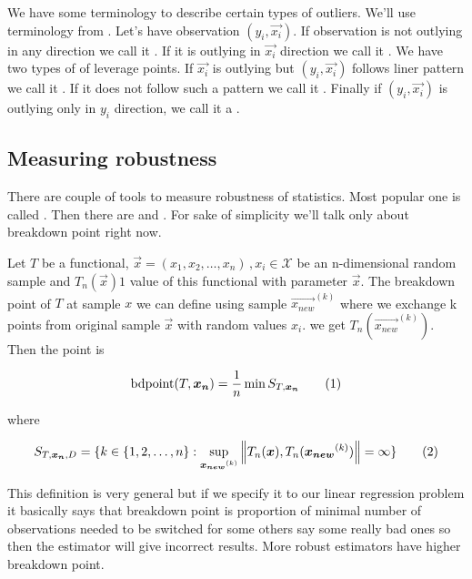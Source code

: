 We have some terminology to describe certain types of outliers. We'll use terminology from \cite{rouss:1990}. Let's have observation $(y_i, \vec{x_i})$. If observation is not outlying in any direction we call it  . If it is outlying in $\vec{x_i}$ direction we call it . We have two types of of leverage points. If $\vec{x_i}$ is outlying but $(y_i, \vec{x_i})$ follows liner pattern we call it  . If it does not follow such a pattern we call it . Finally if $(y_i, \vec{x_i})$ is  outlying only in $y_i$  direction, we call it a .

\subsection{Measuring robustness}
There are couple of tools to measure robustness of statistics. Most popular one is called . Then there are  and . For sake of simplicity we'll talk only about breakdown point right now. 

\begin{definition}
    Let $T$ be a functional, $\vec{x} = (x_1, x_2,\ldots,x_n)\,, x_i \in \mathcal{X}$ be an n-dimensional random sample and $T_n(\vec{x})1$ value of this functional with parameter $\vec{x}$. The breakdown point of $T$ at sample $x$ we can define using sample $\vec{x_{new}}^(k)$ where we exchange k points from original sample $\vec{x}$ with random values $x_i$. we get $T_n(\vec{x_{new}}^{(k)})$. Then the  point is 


\begin{equation}
    \bdpoint(T,\vec{x_n} ) = \frac{1}{n} \min S_{T, \vec{x_n}}  \numberthis
\end{equation}

where 

\begin{equation}
   S_{T, \vec{x_n}, D} =   \{{k \in \{{1,2, \ldots ,n\}} : \sup_{ \vec{x_{new}}^{(k)} } \norm{T_n(\vec{x}), T_n(\vec{x_{new}}^{(k)})} = \infty   \}}   \numberthis
\end{equation}


\end{definition}

This definition is very general but if we specify it to our linear regression problem it basically says that breakdown point is proportion of minimal number of observations needed to be switched for some others say some really bad ones so then the estimator will give incorrect results. More robust estimators have higher breakdown point. 

